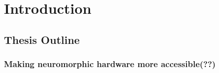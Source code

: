 \chapter{Introduction}
\label{chapter:introduction}

\section{Thesis Outline}

\subsection{Making neuromorphic hardware more accessible(??)}
